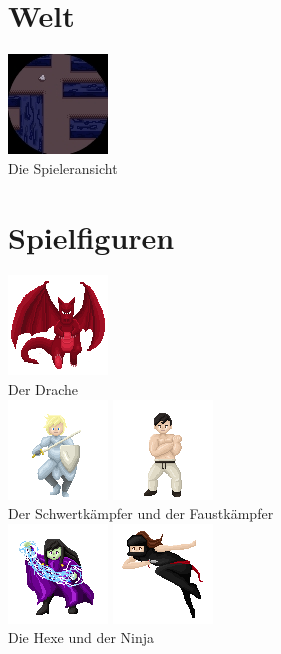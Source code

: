 \documentclass[10pt,a4paper,notitlepage]{report}
\begin{document}
\begin{flushleft}
\section{Welt}
	\begin{center}
			\includegraphics[scale=3]{Maze.jpg}\\
		Die Spieleransicht\\
	\end{center}

\section{Spielfiguren}
\begin{center}
	\includegraphics[scale=3]{Dragon.png}\\
	Der Drache\\
		
	\includegraphics[scale=2]{Knight.png}
	\includegraphics[scale=2]{Fighter.png}\\
	Der Schwertkämpfer und der Faustkämpfer\\
	
	\includegraphics[scale=2]{Witch}
	\includegraphics[scale=2]{Ninja}\\
	Die Hexe und der Ninja\\
	

\end{center}
\end{flushleft}
\end{document}
